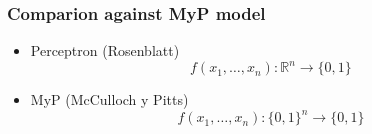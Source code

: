 \documentclass[aspectratio=169]{beamer}
\begin{document}
\begin{frame}
\frametitle{Comparion against MyP model}
\begin{itemize}
	\item Perceptron (Rosenblatt)
	\begin{equation}
		f(x_1, \dots, x_n): \mathbb{
			R}^n \rightarrow \{0,1\}
	\end{equation}
	\item MyP (McCulloch y Pitts)
	\begin{equation}
		f(x_1, \dots, x_n): \{0, 1\}^n \rightarrow \{0,1\}
	\end{equation}
\end{itemize}
\end{frame}






%		


\end{document}
